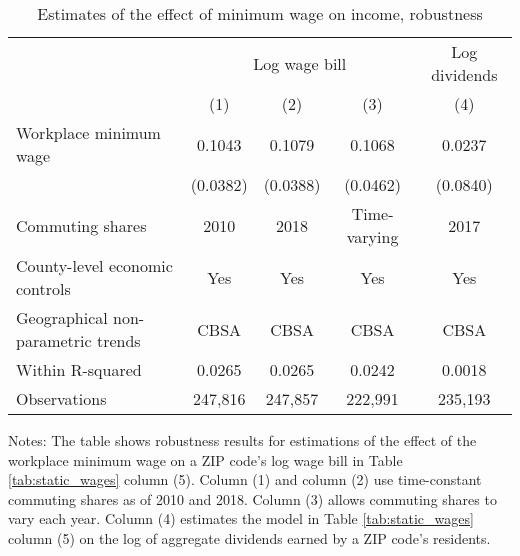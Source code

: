 \begin{table}[]
    \caption{Estimates of the effect of minimum wage on income, robustness}
    \label{tab:static_wages_robustness}

    \begin{tabular}{@{}lcccc@{}}
        \toprule
                                        & \multicolumn{3}{c}{Log wage bill} & Log dividends      \\ \cmidrule(l){2-5} 
                                        & (1)       & (2)      & (3)          & (4)              \\ \midrule
        Workplace minimum wage             & 0.1043   & 0.1079    & 0.1068       & 0.0237            \\
                                        & (0.0382) & (0.0388)  & (0.0462)     & (0.0840)          \\ \midrule
        Commuting shares                   & 2010     & 2018      & Time-varying & 2017              \\
        County-level economic controls     & Yes      & Yes       & Yes          & Yes               \\
        Geographical non-parametric trends & CBSA     & CBSA      & CBSA         & CBSA              \\
        Within R-squared                   & 0.0265   & 0.0265    & 0.0242        & 0.0018              \\
        Observations                       & 247,816  & 247,857   & 222,991       & 235,193              \\ \bottomrule
    \end{tabular}
    
    \begin{minipage}{.95\textwidth} \footnotesize
        \vspace{2mm}
        Notes: The table shows robustness results for estimations of the effect of the workplace
        minimum wage on a ZIP code's log wage bill in Table \ref{tab:static_wages} column (5).
        Column (1) and column (2) use time-constant commuting shares as of 2010 and 2018.
        Column (3) allows commuting shares to vary each year.
        Column (4) estimates the model in Table \ref{tab:static_wages} column (5) on the log
        of aggregate dividends earned by a ZIP code's residents.
    \end{minipage}
\end{table}
